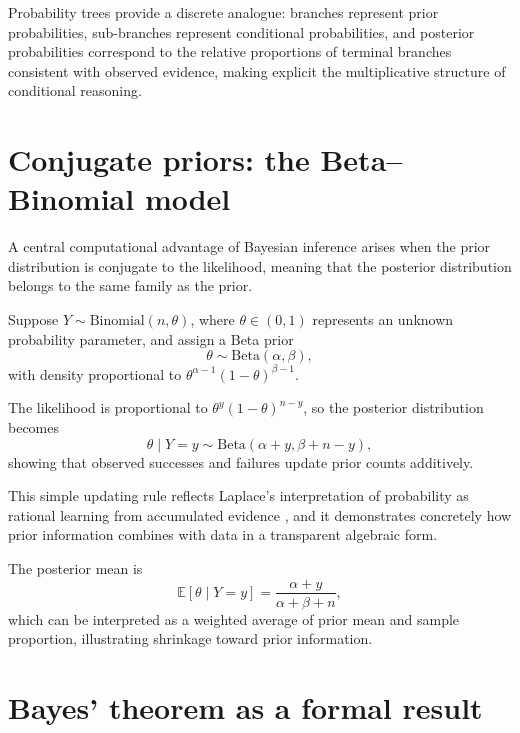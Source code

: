 \medskip

Probability trees provide a discrete analogue: branches represent prior probabilities, sub-branches represent conditional probabilities, and posterior probabilities correspond to the relative proportions of terminal branches consistent with observed evidence, making explicit the multiplicative structure of conditional reasoning. 


\section{Conjugate priors: the Beta--Binomial model}

A central computational advantage of Bayesian inference arises when the prior distribution is conjugate to the likelihood, meaning that the posterior distribution belongs to the same family as the prior. 

\medskip

Suppose \(Y \sim \text{Binomial}(n,\theta)\), where \(\theta \in (0,1)\) represents an unknown probability parameter, and assign a Beta prior 
\[
\theta \sim \text{Beta}(\alpha,\beta),
\]
with density proportional to \(\theta^{\alpha-1}(1-\theta)^{\beta-1}\). 

\medskip

The likelihood is proportional to \(\theta^{y}(1-\theta)^{n-y}\), so the posterior distribution becomes 
\[
\theta \mid Y=y \sim \text{Beta}(\alpha + y,\beta + n - y),
\]
showing that observed successes and failures update prior counts additively. 

\medskip

This simple updating rule reflects Laplace’s interpretation of probability as rational learning from accumulated evidence \cite{laplace_1812_theorie}, and it demonstrates concretely how prior information combines with data in a transparent algebraic form. 

\medskip

The posterior mean is 
\[
\mathbb{E}[\theta \mid Y=y] = \frac{\alpha + y}{\alpha + \beta + n},
\]
which can be interpreted as a weighted average of prior mean and sample proportion, illustrating shrinkage toward prior information. 


\section{Bayes' theorem as a formal result}

